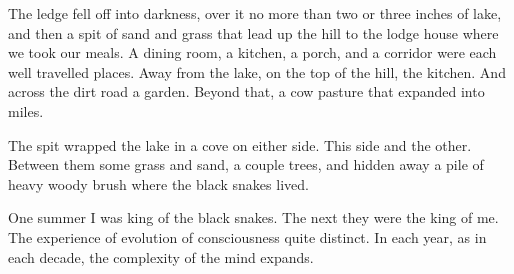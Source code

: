 

The ledge fell off into darkness, over it no more than two or three
inches of lake, and then a spit of sand and grass that lead up the
hill to the lodge house where we took our meals.  A dining room, a
kitchen, a porch, and a corridor were each well travelled places.
Away from the lake, on the top of the hill, the kitchen.  And across
the dirt road a garden.  Beyond that, a cow pasture that expanded into
miles.

The spit wrapped the lake in a cove on either side.  This side and the
other.  Between them some grass and sand, a couple trees, and hidden
away a pile of heavy woody brush where the black snakes lived.

One summer I was king of the black snakes.  The next they were the
king of me.  The experience of evolution of consciousness quite
distinct.  In each year, as in each decade, the complexity of the mind
expands.

\bye
